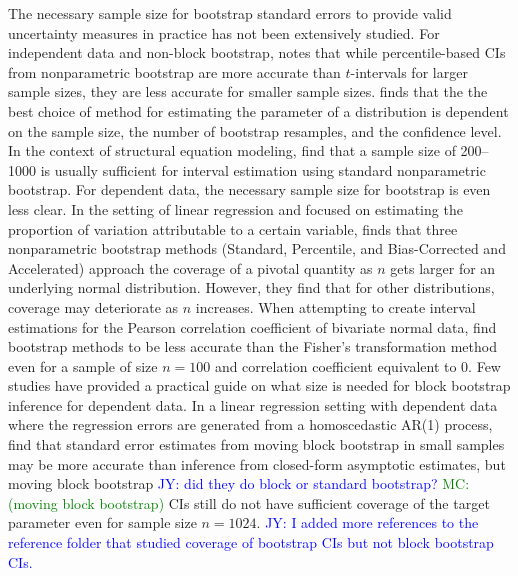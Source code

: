\documentclass[12pt, letterpaper, titlepage]{article}
\newcommand{\jy}[1]{\textcolor{blue}{JY: #1}}
\newcommand{\mc}[1]{\textcolor{green}{MC: (#1)}}
\begin{document}
The necessary sample size for bootstrap standard errors to provide valid
uncertainty measures in practice has not been extensively studied. For
independent data and non-block bootstrap, \citet{hesterberg2015teachers} notes
that while percentile-based CIs from nonparametric bootstrap
are more accurate than $t$-intervals for larger sample sizes, they are
less accurate for smaller sample sizes. \citet{chernick2009revisiting} finds that the the best choice of method for estimating
the parameter of a distribution is dependent on the sample size, the number of
bootstrap resamples, and the confidence level. In the context of structural equation
modeling, \citet{nevitt2001performance} find
that a sample size of 200--1000 is usually sufficient for interval estimation
using standard nonparametric bootstrap. For dependent data, the necessary
sample
size for bootstrap is even less clear. In the setting of linear regression and focused on estimating the proportion of 
variation attributable to a certain variable, \citet{burch2012nonparametric} finds
that three nonparametric bootstrap methods (Standard, Percentile, and Bias-Corrected and
Accelerated) approach the coverage of a pivotal quantity as $n$ gets larger for an
underlying normal distribution. However, they find that for other distributions, 
coverage may deteriorate as $n$ increases. 
When attempting to create interval estimations for the Pearson correlation 
coefficient of bivariate normal data, \citet{puth2015variety} find bootstrap 
methods to be less accurate than the Fisher's transformation method even 
for a sample of size $n = 100$ and correlation coefficient equivalent to 0.
Few studies have provided a practical guide on what size is needed
for block bootstrap inference for dependent data.
In a linear regression setting
with
dependent data where the
regression errors are generated from a homoscedastic AR(1) process, 
\citet{goncalves2005bootstrap} find that standard error
estimates from moving 
block bootstrap in small samples may be more accurate than
inference from closed-form asymptotic estimates, but moving block bootstrap 
\jy{did they do block or standard bootstrap?}
\mc{moving block bootstrap}
CIs still do not have sufficient coverage of the target parameter even for sample size
$n = 1024$.
\jy{I added more references to the reference folder that studied coverage of
  bootstrap CIs but not block bootstrap CIs.}
\end{document}
